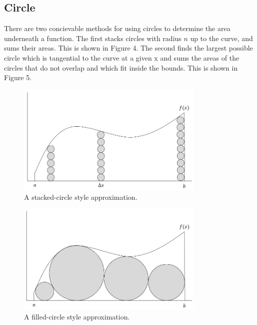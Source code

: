 \documentclass{article}
\begin{document}
    \subsection{Circle}
      There are two concievable methods for using circles to determine the area underneath a function. The first stacks circles with radius \( n \) up to the curve, and sums their areas. This is shown in Figure 4. The second finds the largest possible circle which is tangential to the curve at a given x and sums the areas of the circles that do not overlap and which fit inside the bounds. This is shown in Figure 5.

      \begin{figure}[h]
        \centering
        \includegraphics[width=0.8\textwidth]{circle_example_1}
        \caption{A stacked-circle style approximation.}
      \end{figure}

      \begin{figure}[h]
        \centering
        \includegraphics[width=0.8\textwidth]{circle_example_2}
        \caption{A filled-circle style approximation.}
      \end{figure}
\end{document}
